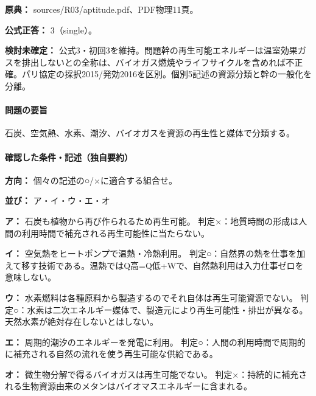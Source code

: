 \noindent\textbf{原典：} sources/R03/aptitude.pdf、PDF物理11頁。

\textbf{公式正答：} 3（single）。

\par\textbf{検討未確定：} 公式3・初回3を維持。問題幹の再生可能エネルギーは温室効果ガスを排出しないとの全称は、バイオガス燃焼やライフサイクルを含めれば不正確。パリ協定の採択2015/発効2016を区別。個別5記述の資源分類と幹の一般化を分離。

\paragraph{問題の要旨} 石炭、空気熱、水素、潮汐、バイオガスを資源の再生性と媒体で分類する。

\paragraph{確認した条件・記述（独自要約）}\mbox{}\par

\noindent\textbf{方向：} 個々の記述の○/×に適合する組合せ。\par

\noindent\textbf{並び：} ア・イ・ウ・エ・オ\par

\noindent\textbf{ア：} 石炭も植物から再び作られるため再生可能。 判定×：地質時間の形成は人間の利用時間で補充される再生可能性に当たらない。\par

\noindent\textbf{イ：} 空気熱をヒートポンプで温熱・冷熱利用。 判定○：自然界の熱を仕事を加えて移す技術である。温熱ではQ高=Q低+Wで、自然熱利用は入力仕事ゼロを意味しない。\par

\noindent\textbf{ウ：} 水素燃料は各種原料から製造するのでそれ自体は再生可能資源でない。 判定○：水素は二次エネルギー媒体で、製造元により再生可能性・排出が異なる。天然水素が絶対存在しないとはしない。\par

\noindent\textbf{エ：} 周期的潮汐のエネルギーを発電に利用。 判定○：人間の利用時間で周期的に補充される自然の流れを使う再生可能な供給である。\par

\noindent\textbf{オ：} 微生物分解で得るバイオガスは再生可能でない。 判定×：持続的に補充される生物資源由来のメタンはバイオマスエネルギーに含まれる。\par

